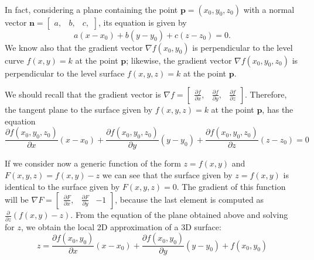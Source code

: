 \paragraph{}
In fact, considering a plane containing the point $\textbf{p} = (x_0, y_0, z_0)$ with a normal vector $\textbf{n} = \begin{bmatrix} a, & b, & c, \end{bmatrix}$, its equation is given by
\begin{equation}
    a(x - x_0) + b(y - y_0) + c(z - z_0) = 0.
\end{equation}
We know \cite{plane_local_approx} also that the gradient vector $\nabla f(x_0, y_0)$ is perpendicular to the level curve $f(x, y) = k$ at the point $\textbf{p}$; likewise, the gradient vector $\nabla f(x_0, y_0, z_0)$ is perpendicular to the level surface $f(x, y, z) = k$ at the point $\textbf{p}$. 

We should recall that the gradient vector is $\nabla f = \begin{bmatrix} \frac{\partial f}{\partial x}, & \frac{\partial f}{\partial y}, & \frac{\partial f}{\partial z} \end{bmatrix}$. Therefore, the tangent plane to the surface given by $f(x, y, z) = k$ at the point $\textbf{p}$, has the equation
\begin{equation}
    \frac{\partial f(x_0, y_0, z_0)}{\partial x}(x - x_0) + \frac{\partial f(x_0, y_0, z_0)}{\partial y}(y - y_0) + \frac{\partial f(x_0, y_0, z_0)}{\partial z}(z - z_0) = 0
\end{equation}

If we consider now a generic function of the form $z = f(x, y)$ and $F(x, y, z) = f(x, y) - z$ we can see that the surface given by $z = f(x, y)$ is identical to the surface given by $F(x, y, z) = 0$. The gradient of this function will be $\nabla F = \begin{bmatrix} \frac{\partial F}{\partial x}, & \frac{\partial F}{\partial y} & -1\end{bmatrix}$, because the last element is computed as $\frac{\partial }{\partial z}(f(x, y) - z)$. \newline
From the equation of the plane obtained above and solving for $z$, we obtain the local 2D approximation of a 3D surface:
\begin{equation}
    z = \frac{\partial f(x_0, y_0)}{\partial x}(x - x_0) + \frac{\partial f(x_0, y_0)}{\partial y}(y - y_0) + f(x_0, y_0)
\end{equation}

